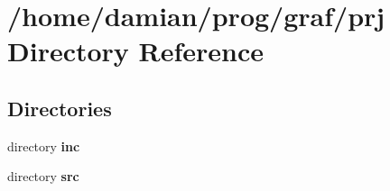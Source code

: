 \section{/home/damian/prog/graf/prj Directory Reference}
\label{dir_4aa64b0872d36146e049722e293482e3}
\subsection*{Directories}
\begin{DoxyCompactItemize}
\item 
directory {\bf inc}
\item 
directory {\bf src}
\end{DoxyCompactItemize}
